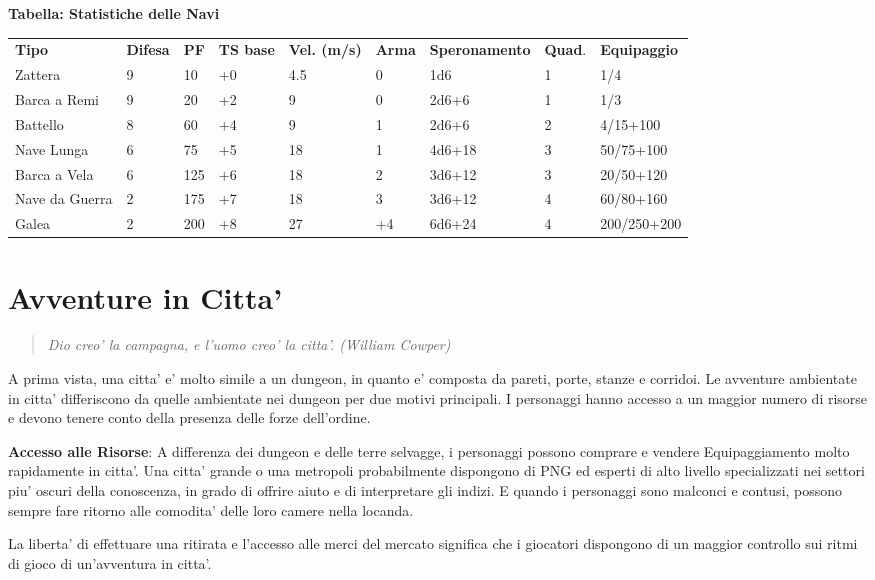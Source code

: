 \documentclass[a4paper,11pt,twoside,openany]{book}
\begin{document}
{\bigskip

\textbf{Tabella: Statistiche delle Navi}

\medskip

\begin{tabular}{L{2cm} L{1cm} L{1cm} L{1cm} L{1.5cm} L{1cm} L{2cm} L{1cm} L{2cm}}
\toprule
\textbf{Tipo} & \textbf{Difesa} & \textbf{PF} & \textbf{TS base} & \textbf{Vel. (m/s)} & \textbf{Arma} & \textbf{Speronamento} & \textbf{Quad}. & \textbf{Equipaggio}\tabularnewline
Zattera & 9 & 10 & +0 & 4.5 & 0 & 1d6 & 1 & 1/4\tabularnewline
Barca a Remi & 9 & 20 & +2 & 9 & 0 & 2d6+6 & 1 & 1/3\tabularnewline
Battello & 8 & 60 & +4 & 9 & 1 & 2d6+6 & 2 & 4/15+100\tabularnewline
Nave Lunga & 6 & 75 & +5 & 18 & 1 & 4d6+18 & 3 & 50/75+100\tabularnewline
Barca a Vela & 6 & 125 & +6 & 18 & 2 & 3d6+12 & 3 & 20/50+120\tabularnewline
Nave da Guerra & 2 & 175 & +7 & 18 & 3 & 3d6+12 & 4 & 60/80+160\tabularnewline
Galea & 2 & 200 & +8 & 27 & +4 & 6d6+24 & 4 & 200/250+200\tabularnewline
\end{tabular}}

\pagebreak

\section{Avventure in Citta'}

\label{avventure-in-citta}
\begin{quote}\textit{
Dio creo' la campagna, e l'uomo creo' la citta'. (William Cowper)
}\end{quote}

A prima vista, una citta' e' molto simile a un dungeon, in quanto e' composta da pareti, porte, stanze e corridoi. Le avventure ambientate in citta' differiscono da quelle ambientate nei dungeon per due motivi principali. I personaggi hanno accesso a un maggior numero di risorse e devono tenere conto della presenza delle forze dell'ordine.

\textbf{Accesso alle Risorse}: A differenza dei dungeon e delle terre selvagge, i personaggi possono comprare e vendere Equipaggiamento molto rapidamente in citta'. Una citta' grande o una metropoli probabilmente dispongono di PNG ed esperti di alto livello specializzati nei settori piu' oscuri della conoscenza, in grado di offrire aiuto e di interpretare gli indizi. E quando i personaggi sono malconci e contusi, possono sempre fare ritorno alle comodita' delle loro camere nella locanda.

La liberta' di effettuare una ritirata e l'accesso alle merci del mercato significa che i giocatori dispongono di un maggior controllo sui ritmi di gioco di un'avventura in citta'.
\end{document}

